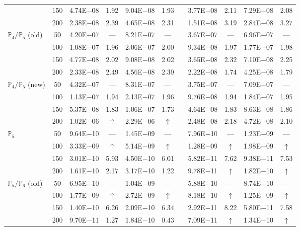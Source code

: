 \begin{table}[H]
{\begin{tabular}{@{}l c c c c c c c c c c@{}}
 & 150 & 4.74E$-$08 & 1.92  & 9.04E$-$08 & 1.93 &  & 3.77E$-$08 & 2.11 & 7.29E$-$08 & 2.08\\
 & 200 & 2.38E$-$08 & 2.39  & 4.65E$-$08 & 2.31 &  & 1.51E$-$08 & 3.19 & 2.84E$-$08 & 3.27\\
\midrule
\multirow{4}{*}{$\mathbb{P}_{4}/\mathbb{P}_{5}$ (old)}
 & 50 & 4.20E$-$07 & ---  & 8.21E$-$07 & --- &  & 3.67E$-$07 & --- & 6.96E$-$07 & ---\\
 & 100 & 1.08E$-$07 & 1.96  & 2.06E$-$07 & 2.00 &  & 9.34E$-$08 & 1.97 & 1.77E$-$07 & 1.98\\
 & 150 & 4.77E$-$08 & 2.02  & 9.08E$-$08 & 2.02 &  & 3.65E$-$08 & 2.32 & 7.10E$-$08 & 2.25\\
 & 200 & 2.33E$-$08 & 2.49  & 4.56E$-$08 & 2.39 &  & 2.22E$-$08 & 1.74 & 4.25E$-$08 & 1.79\\
\midrule
\multirow{4}{*}{$\mathbb{P}_{4}/\mathbb{P}_{5}$ (new)}
 & 50 & 4.32E$-$07 & ---  & 8.31E$-$07 & --- &  & 3.75E$-$07 & --- & 7.09E$-$07 & ---\\
 & 100 & 1.13E$-$07 & 1.94  & 2.13E$-$07 & 1.96 &  & 9.76E$-$08 & 1.94 & 1.84E$-$07 & 1.95\\
 & 150 & 5.37E$-$08 & 1.83  & 1.06E$-$07 & 1.73 &  & 4.64E$-$08 & 1.83 & 8.63E$-$08 & 1.86\\
 & 200 & 1.02E$-$06 & $\uparrow$  & 2.29E$-$06 & $\uparrow$ &  & 2.48E$-$08 & 2.18 & 4.72E$-$08 & 2.10\\
\midrule
\multirow{4}{*}{$\mathbb{P}_{5}$}
 & 50 & 9.64E$-$10 & ---  & 1.45E$-$09 & --- &  & 7.96E$-$10 & --- & 1.23E$-$09 & ---\\
 & 100 & 3.33E$-$09 & $\uparrow$  & 5.14E$-$09 & $\uparrow$ &  & 1.28E$-$09 & $\uparrow$ & 1.98E$-$09 & $\uparrow$\\
 & 150 & 3.01E$-$10 & 5.93  & 4.50E$-$10 & 6.01 &  & 5.82E$-$11 & 7.62 & 9.38E$-$11 & 7.53\\
 & 200 & 1.61E$-$10 & 2.17  & 3.17E$-$10 & 1.22 &  & 9.78E$-$11 & $\uparrow$ & 1.82E$-$10 & $\uparrow$\\
\midrule
\multirow{4}{*}{$\mathbb{P}_{5}/\mathbb{P}_{6}$ (old)}
 & 50 & 6.95E$-$10 & ---  & 1.04E$-$09 & --- &  & 5.88E$-$10 & --- & 8.74E$-$10 & ---\\
 & 100 & 1.77E$-$09 & $\uparrow$  & 2.72E$-$09 & $\uparrow$ &  & 8.18E$-$10 & $\uparrow$ & 1.25E$-$09 & $\uparrow$\\
 & 150 & 1.40E$-$10 & 6.26  & 2.09E$-$10 & 6.34 &  & 2.92E$-$11 & 8.22 & 5.80E$-$11 & 7.58\\
 & 200 & 9.70E$-$11 & 1.27  & 1.84E$-$10 & 0.43 &  & 7.09E$-$11 & $\uparrow$ & 1.34E$-$10 & $\uparrow$\\

\end{tabular}}
\end{table}
